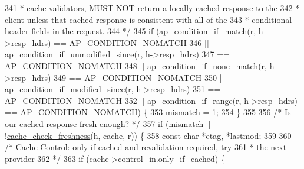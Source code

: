 \begin{DoxyCode}
341 \textcolor{comment}{             * cache validators, MUST NOT return a locally cached response to the}
342 \textcolor{comment}{             * client unless that cached response is consistent with all of the}
343 \textcolor{comment}{             * conditional header fields in the request.}
344 \textcolor{comment}{             */}
345             \textcolor{keywordflow}{if} (ap\_condition\_if\_match(r, h->\hyperlink{structcache__handle_a66c4c1875bb9740d34ddda4d3e71065e}{resp\_hdrs}) == 
      \hyperlink{group__APACHE__CORE__PROTO_gga0c22f044612f116fb81886e73bbce80baa8fec426bc27e2c7c079f92975cc24f9}{AP\_CONDITION\_NOMATCH}
346                     || ap\_condition\_if\_unmodified\_since(r, h->\hyperlink{structcache__handle_a66c4c1875bb9740d34ddda4d3e71065e}{resp\_hdrs})
347                             == \hyperlink{group__APACHE__CORE__PROTO_gga0c22f044612f116fb81886e73bbce80baa8fec426bc27e2c7c079f92975cc24f9}{AP\_CONDITION\_NOMATCH}
348                     || ap\_condition\_if\_none\_match(r, h->\hyperlink{structcache__handle_a66c4c1875bb9740d34ddda4d3e71065e}{resp\_hdrs})
349                             == \hyperlink{group__APACHE__CORE__PROTO_gga0c22f044612f116fb81886e73bbce80baa8fec426bc27e2c7c079f92975cc24f9}{AP\_CONDITION\_NOMATCH}
350                     || ap\_condition\_if\_modified\_since(r, h->\hyperlink{structcache__handle_a66c4c1875bb9740d34ddda4d3e71065e}{resp\_hdrs})
351                             == \hyperlink{group__APACHE__CORE__PROTO_gga0c22f044612f116fb81886e73bbce80baa8fec426bc27e2c7c079f92975cc24f9}{AP\_CONDITION\_NOMATCH}
352                     || ap\_condition\_if\_range(r, h->\hyperlink{structcache__handle_a66c4c1875bb9740d34ddda4d3e71065e}{resp\_hdrs}) == 
      \hyperlink{group__APACHE__CORE__PROTO_gga0c22f044612f116fb81886e73bbce80baa8fec426bc27e2c7c079f92975cc24f9}{AP\_CONDITION\_NOMATCH}) \{
353                 mismatch = 1;
354             \}
355 
356             \textcolor{comment}{/* Is our cached response fresh enough? */}
357             \textcolor{keywordflow}{if} (mismatch || !\hyperlink{group__Cache__util_ga8719ff14e3ad87c32614da9fc10cb119}{cache\_check\_freshness}(h, cache, r)) \{
358                 \textcolor{keyword}{const} \textcolor{keywordtype}{char} *etag, *lastmod;
359 
360                 \textcolor{comment}{/* Cache-Control: only-if-cached and revalidation required, try}
361 \textcolor{comment}{                 * the next provider}
362 \textcolor{comment}{                 */}
363                 \textcolor{keywordflow}{if} (cache->\hyperlink{structcache__request__rec_aaea78b272eb05f1ba67a75bd6264b4df}{control\_in}.\hyperlink{structcache__control_aeca404f2dd16548ae4fbde3592602764}{only\_if\_cached}) \{

\end{DoxyCode}
